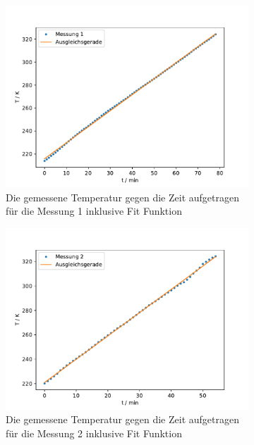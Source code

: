 \begin{figure}
  
  \centering
  \begin{subfigure}[b]{0.45\textwidth}
      \centering
      \includegraphics[width=\textwidth]{build_j/zeit_temp_fit_1.pdf}
      \caption{Die gemessene Temperatur gegen die Zeit aufgetragen für die Messung 1 inklusive Fit Funktion}
  \end{subfigure}
  \hfill
  \begin{subfigure}[b]{0.45\textwidth}
      \centering
      \includegraphics[width=\textwidth]{build_j/zeit_temp_fit_2.pdf}
      \caption{Die gemessene Temperatur gegen die Zeit aufgetragen für die Messung 2 inklusive Fit Funktion}
  \end{subfigure}
  \caption{}
  \label{fig:2-linregress}
\end{figure}


